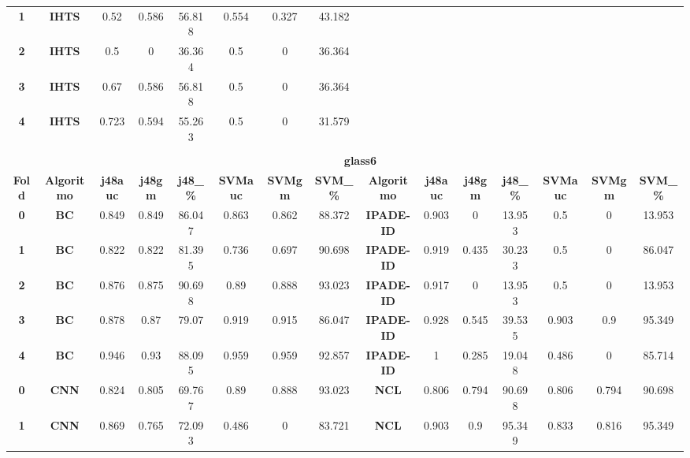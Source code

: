 {{\begin{tabular}{c|c|cccccc|ccccccc}
\textbf{1} & \textbf{IHTS} & 0.52  & 0.586 & 56.818 & 0.554 & 0.327 & 43.182 &       &       &       &       &       &       &  \\
\textbf{2} & \textbf{IHTS} & 0.5   & 0     & 36.364 & 0.5   & 0     & 36.364 &       &       &       &       &       &       &  \\
\textbf{3} & \textbf{IHTS} & 0.67  & 0.586 & 56.818 & 0.5   & 0     & 36.364 &       &       &       &       &       &       &  \\
\textbf{4} & \textbf{IHTS} & 0.723 & 0.594 & 55.263 & 0.5   & 0     & 31.579 &       &       &       &       &       &       &  \\
\multicolumn{1}{c}{} & \multicolumn{1}{c}{} &       &       &       &       &       & \multicolumn{1}{c}{} &       &       &       &       &       &       &  \\
\multicolumn{1}{c}{} & \multicolumn{14}{c}{\textbf{glass6}} \\
\midrule
\textbf{Fold} & \textbf{Algoritmo} & \textbf{j48auc} & \textbf{j48gm} & \textbf{j48\_\%} & \textbf{SVMauc} & \textbf{SVMgm} & \textbf{SVM\_\%} & \multicolumn{1}{c|}{\textbf{Algoritmo}} & \textbf{j48auc} & \textbf{j48gm} & \textbf{j48\_\%} & \textbf{SVMauc} & \textbf{SVMgm} & \textbf{SVM\_\%} \\
\midrule
\textbf{0} & \textbf{BC} & 0.849 & 0.849 & 86.047 & 0.863 & 0.862 & 88.372 & \multicolumn{1}{c|}{\textbf{IPADE-ID}} & 0.903 & 0     & 13.953 & 0.5   & 0     & 13.953 \\
\textbf{1} & \textbf{BC} & 0.822 & 0.822 & 81.395 & 0.736 & 0.697 & 90.698 & \multicolumn{1}{c|}{\textbf{IPADE-ID}} & 0.919 & 0.435 & 30.233 & 0.5   & 0     & 86.047 \\
\textbf{2} & \textbf{BC} & 0.876 & 0.875 & 90.698 & 0.89  & 0.888 & 93.023 & \multicolumn{1}{c|}{\textbf{IPADE-ID}} & 0.917 & 0     & 13.953 & 0.5   & 0     & 13.953 \\
\textbf{3} & \textbf{BC} & 0.878 & 0.87  & 79.07 & 0.919 & 0.915 & 86.047 & \multicolumn{1}{c|}{\textbf{IPADE-ID}} & 0.928 & 0.545 & 39.535 & 0.903 & 0.9   & 95.349 \\
\textbf{4} & \textbf{BC} & 0.946 & 0.93  & 88.095 & 0.959 & 0.959 & 92.857 & \multicolumn{1}{c|}{\textbf{IPADE-ID}} & 1     & 0.285 & 19.048 & 0.486 & 0     & 85.714 \\
\textbf{0} & \textbf{CNN} & 0.824 & 0.805 & 69.767 & 0.89  & 0.888 & 93.023 & \multicolumn{1}{c|}{\textbf{NCL}} & 0.806 & 0.794 & 90.698 & 0.806 & 0.794 & 90.698 \\
\textbf{1} & \textbf{CNN} & 0.869 & 0.765 & 72.093 & 0.486 & 0     & 83.721 & \multicolumn{1}{c|}{\textbf{NCL}} & 0.903 & 0.9   & 95.349 & 0.833 & 0.816 & 95.349 \\

\end{tabular}}}
